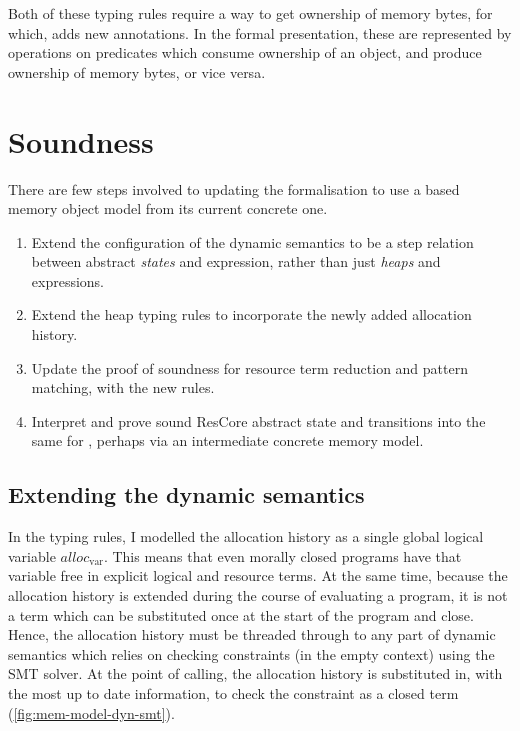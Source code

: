 Both of these typing rules require a way to get ownership of memory bytes, for
which,  adds new annotations.
In the formal presentation, these are represented by operations on predicates
which consume ownership of an object, and produce ownership of memory bytes, or
vice versa.

\section{Soundness}\label{sec:cn-vip-soundness}

There are few steps involved to updating the formalisation to use a 
based memory object model from its current concrete one.
\begin{enumerate}
    \item Extend the configuration of the dynamic semantics to be a step
        relation between abstract \emph{states} and expression, rather than
        just \emph{heaps} and expressions.
    \item Extend the heap typing rules to incorporate the newly added
        allocation history.
    \item Update the proof of soundness for resource term reduction and pattern
        matching, with the new rules.
    \item Interpret and prove sound ResCore abstract state and transitions into
        the same for , perhaps via an intermediate concrete
        memory model.
\end{enumerate}

\subsection{Extending the dynamic semantics}

In the typing rules, I modelled the allocation history as a single global
logical variable $\mathit{alloc}_\mathrm{var}$. This means that even morally
closed programs have that variable free in explicit logical and resource terms.
At the same time, because the allocation history is extended during the course
of evaluating a  program, it is not a term which can be substituted
once at the start of the program and close. Hence, the allocation history must
be threaded through to any part of dynamic semantics which relies on checking
constraints (in the empty context) using the SMT solver. At the point of
calling, the allocation history is substituted in, with the most up to date
information, to check the constraint as a closed term (\cref{fig:mem-model-dyn-smt}).

